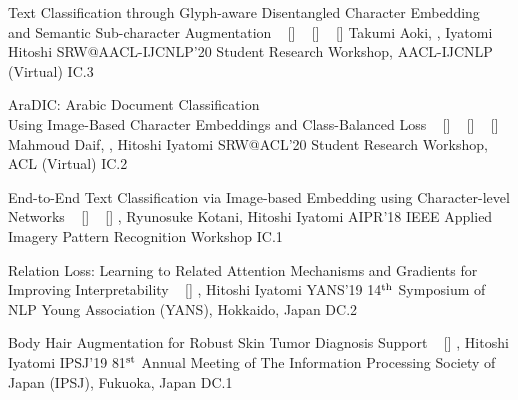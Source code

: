 \begin{publications}
    \publication
        {Text Classification through Glyph-aware Disentangled Character Embedding \\ and Semantic Sub-character Augmentation}
        {
            ~ [\href{https://aclanthology.org/2020.aacl-srw.1/}{\small{\linkSymbol}}]
            ~ [\href{https://arxiv.org/abs/2011.04184}{\small{\arxivSymbol}}]
            ~ [\href{https://github.com/IyatomiLab/GDCE-SSA}{\small{\githubSymbol}}]
        }
        {Takumi Aoki, \underline{}, Iyatomi Hitoshi}
        {SRW@AACL-IJCNLP'20} {Student Research Workshop, AACL-IJCNLP (Virtual)} {IC.3}

    \publication
        {AraDIC: Arabic Document Classification \\ Using Image-Based Character Embeddings and Class-Balanced Loss}
        {
            ~ [\href{https://aclanthology.org/2020.acl-srw.29/}{\small{\linkSymbol}}]
            ~ [\href{https://arxiv.org/abs/2006.11586}{\small{\arxivSymbol}}]
            ~ [\href{https://github.com/IyatomiLab/GDCE-SSA}{\small{\githubSymbol}}]
        }
        {Mahmoud Daif, \underline{}, Hitoshi Iyatomi}
        {SRW@ACL'20} {Student Research Workshop, ACL (Virtual)} {IC.2}
        
    \publication
        {End-to-End Text Classification via Image-based Embedding using Character-level Networks}
        {
            ~ [\href{https://ieeexplore.ieee.org/document/8707407}{\small{\linkSymbol}}]
            ~ [\href{https://arxiv.org/abs/1810.03595}{\small{\arxivSymbol}}]
        }
        {\underline{}, Ryunosuke Kotani, Hitoshi Iyatomi}
        {AIPR'18} {IEEE Applied Imagery Pattern Recognition Workshop} {IC.1}


    \publication
        {Relation Loss: Learning to Related Attention Mechanisms and Gradients for Improving Interpretability}
        {
            ~ [\href{https://www.hosei.ac.jp/gs/NEWS/zaigaku/koganei/20190920/}{\small{\linkSymbol}}]
        }
        {\underline{}, Hitoshi Iyatomi}
        {YANS'19} {14$^{\textrm{\scriptsize th}}$ Symposium of NLP Young Association (YANS), Hokkaido, Japan} {DC.2}

    \publication
        {Body Hair Augmentation for Robust Skin Tumor Diagnosis Support}
        {
            ~ [\href{https://www.hosei.ac.jp/gs/NEWS/topics/jusho/190411_4/}{\small{\linkSymbol}}]
        }
        {\underline{}, Hitoshi Iyatomi}
        {IPSJ'19} {81$^{\textrm{\scriptsize st}}$ Annual Meeting of The Information Processing Society of Japan (IPSJ), Fukuoka, Japan} {DC.1}

\end{publications}

